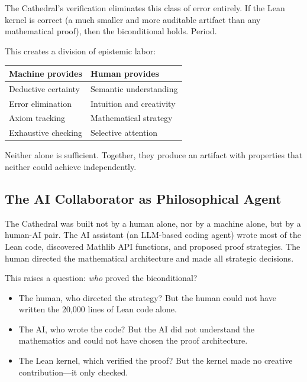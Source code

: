 \documentclass[11pt,a4paper]{article}
\begin{document}
The Cathedral's verification eliminates this class of error entirely.
If the Lean kernel is correct (a much smaller and more auditable
artifact than any mathematical proof), then the biconditional holds.
Period.

This creates a division of epistemic labor:

\begin{center}
\begin{tabular}{@{}ll@{}}
\toprule
\textbf{Machine provides} & \textbf{Human provides} \\
\midrule
Deductive certainty & Semantic understanding \\
Error elimination & Intuition and creativity \\
Axiom tracking & Mathematical strategy \\
Exhaustive checking & Selective attention \\
\bottomrule
\end{tabular}
\end{center}

Neither alone is sufficient. Together, they produce an artifact with
properties that neither could achieve independently.

\subsection{The AI Collaborator as Philosophical Agent}

The Cathedral was built not by a human alone, nor by a machine alone,
but by a human-AI pair. The AI assistant (an LLM-based coding agent)
wrote most of the Lean code, discovered Mathlib API functions,
and proposed proof strategies. The human directed the mathematical
architecture and made all strategic decisions.

This raises a question: \emph{who} proved the biconditional?

\begin{itemize}
  \item The human, who directed the strategy? But the human could not
    have written the 20,000 lines of Lean code alone.
  \item The AI, who wrote the code? But the AI did not understand
    the mathematics and could not have chosen the proof architecture.
  \item The Lean kernel, which verified the proof? But the kernel
    made no creative contribution---it only checked.
\end{itemize}
\end{document}
